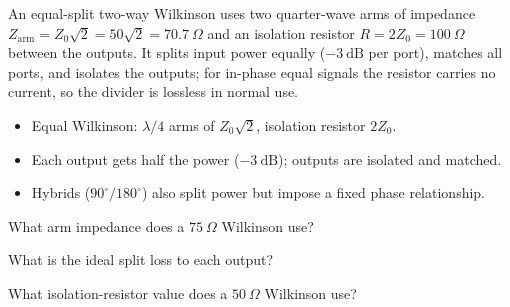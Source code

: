 \begin{workedexample}
An equal-split two-way Wilkinson uses two quarter-wave arms of impedance
$Z_{\text{arm}} = Z_0\sqrt{2} = 50\sqrt{2} = 70.7\ \Omega$ and an isolation
resistor $R = 2Z_0 = 100\ \Omega$ between the outputs. It splits input power
equally ($-3\ \text{dB}$ per port), matches all ports, and isolates the outputs;
for in-phase equal signals the resistor carries no current, so the divider is
lossless in normal use.
\end{workedexample}

\begin{keytakeaways}
\begin{itemize}[leftmargin=1.4em,itemsep=2pt]
\item Equal Wilkinson: $\lambda/4$ arms of $Z_0\sqrt{2}$, isolation resistor $2Z_0$.
\item Each output gets half the power ($-3\ \text{dB}$); outputs are isolated and matched.
\item Hybrids ($90^{\circ}/180^{\circ}$) also split power but impose a fixed phase relationship.
\end{itemize}
\end{keytakeaways}

\begin{exercises}
\item What arm impedance does a $75\ \Omega$ Wilkinson use?
\item What is the ideal split loss to each output?
\item What isolation-resistor value does a $50\ \Omega$ Wilkinson use?
\end{exercises}

